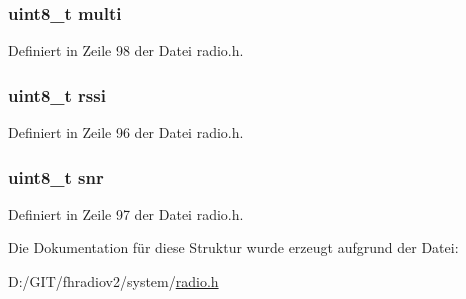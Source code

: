 \subsubsection[{multi}]{\setlength{\rightskip}{0pt plus 5cm}uint8\+\_\+t multi}\label{structradio__rsq_af829dbd700d1c5ad1abccbdb52fa7ba9}


Definiert in Zeile 98 der Datei radio.\+h.

\hypertarget{structradio__rsq_afb67d818cd76cce8057affabcb1979a6}{}
\subsubsection[{rssi}]{\setlength{\rightskip}{0pt plus 5cm}uint8\+\_\+t rssi}\label{structradio__rsq_afb67d818cd76cce8057affabcb1979a6}


Definiert in Zeile 96 der Datei radio.\+h.

\hypertarget{structradio__rsq_a11be3c6f2d5194542e5d1733cbc7ac76}{}
\subsubsection[{snr}]{\setlength{\rightskip}{0pt plus 5cm}uint8\+\_\+t snr}\label{structradio__rsq_a11be3c6f2d5194542e5d1733cbc7ac76}


Definiert in Zeile 97 der Datei radio.\+h.



Die Dokumentation für diese Struktur wurde erzeugt aufgrund der Datei\+:\begin{DoxyCompactItemize}
\item 
D\+:/\+G\+I\+T/fhradiov2/system/\hyperlink{radio_8h}{radio.\+h}\end{DoxyCompactItemize}
